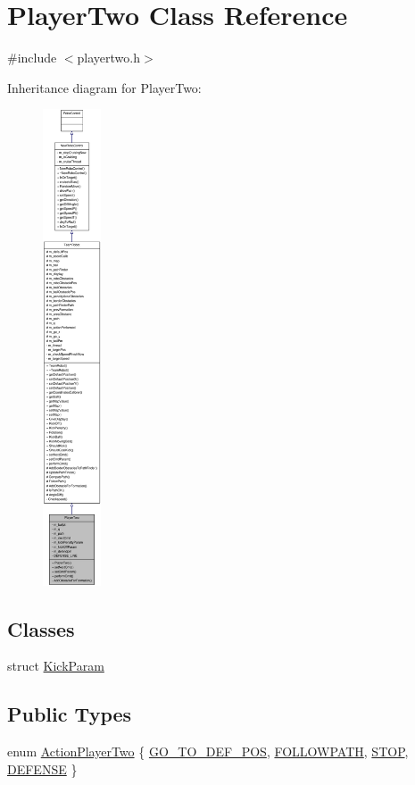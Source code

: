\hypertarget{classPlayerTwo}{
\section{PlayerTwo Class Reference}
\label{classPlayerTwo}
}


{\ttfamily \#include $<$playertwo.h$>$}



Inheritance diagram for PlayerTwo:\nopagebreak
\begin{figure}[H]
\begin{center}
\leavevmode
\includegraphics[height=400pt]{classPlayerTwo__inherit__graph}
\end{center}
\end{figure}
\subsection*{Classes}
\begin{DoxyCompactItemize}
\item 
struct \hyperlink{structPlayerTwo_1_1KickParam}{KickParam}
\end{DoxyCompactItemize}
\subsection*{Public Types}
\begin{DoxyCompactItemize}
\item 
enum \hyperlink{classPlayerTwo_a6dd2b1afb179fe02b677dd71ec5703d2}{ActionPlayerTwo} \{ \hyperlink{classPlayerTwo_a6dd2b1afb179fe02b677dd71ec5703d2a1ee0927d53a79a9c07f3e8347b65ec6e}{GO\_\-TO\_\-DEF\_\-POS}, 
\hyperlink{classPlayerTwo_a6dd2b1afb179fe02b677dd71ec5703d2abd5fef2f14d18f78f33c6e946f1c9cd7}{FOLLOWPATH}, 
\hyperlink{classPlayerTwo_a6dd2b1afb179fe02b677dd71ec5703d2aebb0cbac0bcb8fb7439a980dcc792638}{STOP}, 
\hyperlink{classPlayerTwo_a6dd2b1afb179fe02b677dd71ec5703d2a891b5407c8423ecb7d65df3a7da9b334}{DEFENSE}
 \}
\end{DoxyCompactItemize}
